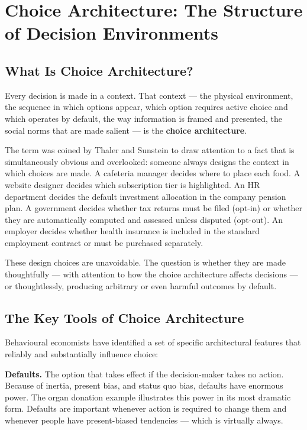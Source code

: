\documentclass[12pt, letterpaper]{article}
\begin{document}
\section{Choice Architecture: The Structure of Decision Environments}



\subsection{What Is Choice Architecture?}


Every decision is made in a context. That context --- the physical environment, the sequence in which options appear, which option requires active choice and which operates by default, the way information is framed and presented, the social norms that are made salient --- is the \textbf{choice architecture}.

The term was coined by Thaler and Sunstein to draw attention to a fact that is simultaneously obvious and overlooked: someone always designs the context in which choices are made. A cafeteria manager decides where to place each food. A website designer decides which subscription tier is highlighted. An HR department decides the default investment allocation in the company pension plan. A government decides whether tax returns must be filed (opt-in) or whether they are automatically computed and assessed unless disputed (opt-out). An employer decides whether health insurance is included in the standard employment contract or must be purchased separately.

These design choices are unavoidable. The question is whether they are made thoughtfully --- with attention to how the choice architecture affects decisions --- or thoughtlessly, producing arbitrary or even harmful outcomes by default.


\subsection{The Key Tools of Choice Architecture}


Behavioural economists have identified a set of specific architectural features that reliably and substantially influence choice:

\textbf{Defaults.} The option that takes effect if the decision-maker takes no action. Because of inertia, present bias, and status quo bias, defaults have enormous power. The organ donation example illustrates this power in its most dramatic form. Defaults are important whenever action is required to change them and whenever people have present-biased tendencies --- which is virtually always.
\end{document}
